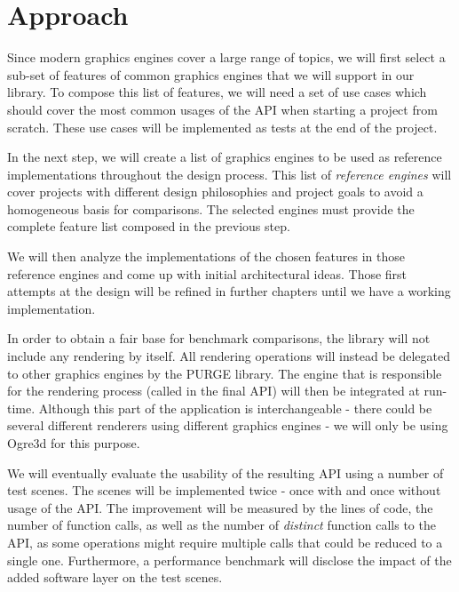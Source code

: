 \section{Approach}

	Since modern graphics engines cover a large range of topics, we will first select a sub-set of features of common graphics engines that we will support in our library. To compose this list of features, we will need a set of use cases which should cover the most common usages of the API when starting a project from scratch. These use cases will be implemented as tests at the end of the project.

	In the next step, we will create a list of graphics engines to be used as reference implementations throughout the design process. This list of \emph{reference engines} will cover projects with different design philosophies and project goals to avoid a homogeneous basis for comparisons. The selected engines must provide the complete feature list composed in the previous step.

	We will then analyze the implementations of the chosen features in those reference engines and come up with initial architectural ideas. Those first attempts at the design will be refined in further chapters until we have a working implementation.

	In order to obtain a fair base for benchmark comparisons, the library will not include any rendering by itself. All rendering operations will instead be delegated to other graphics engines by the PURGE library. The engine that is responsible for the rendering process (called  in the final API) will then be integrated at run-time. Although this part of the application is interchangeable - there could be several different renderers using different graphics engines - we will only be using Ogre3d for this purpose.

	We will eventually evaluate the usability of the resulting API using a number of test scenes. The scenes will be implemented twice - once with and once without usage of the API. The improvement will be measured by the lines of code, the number of function calls, as well as the number of \emph{distinct} function calls to the API, as some operations might require multiple calls that could be reduced to a single one. Furthermore, a performance benchmark will disclose the impact of the added software layer on the test scenes.


